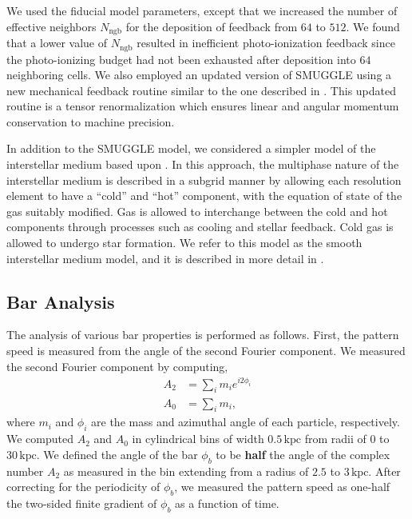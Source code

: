 \documentclass[twocolumn,linenumbers,trackchanges]{aastex631}
\newcommand{\SMUGGLE}{SMUGGLE}
\begin{document}
We used the fiducial model parameters, except that we increased the number of
effective neighbors $N_{\textrm{ngb}}$ for the deposition of feedback from $64$
to $512$. We found that a lower value of $N_{\textrm{ngb}}$ resulted in
inefficient photo-ionization feedback since the photo-ionizing budget had not
been exhausted after deposition into $64$ neighboring cells. We also employed an
updated version of \SMUGGLE{} using a new mechanical feedback routine similar to
the one described in \citet{2018MNRAS.480..800H}. This updated routine is a
tensor renormalization which ensures linear and angular momentum conservation to
machine precision.

In addition to the \SMUGGLE{} model, we considered a simpler model of the
interstellar medium based upon \citet{2003MNRAS.339..289S}. In this approach,
the multiphase nature of the interstellar medium is described in a subgrid
manner by allowing each resolution element to have a ``cold'' and ``hot''
component, with the equation of state of the gas suitably modified. Gas is
allowed to interchange between the cold and hot components through processes
such as cooling and stellar feedback. Cold gas is allowed to undergo star
formation. We refer to this model as the smooth interstellar medium model, and
it is described in more detail in \citet{2019MNRAS.489.4233M}.

\subsection{Bar Analysis}
\label{ssec:bar_analysis}
The analysis of various bar properties is performed as follows. First, the
pattern speed is measured from the angle of the second Fourier component. We
measured the second Fourier component by computing,
\begin{equation}
\begin{split}
A_2 &= \sum_i m_i e^{i 2 \phi_i} \\
A_0 &= \sum_i m_i \textrm{,}
\end{split}
\end{equation}
where $m_i$ and $\phi_i$ are the mass and azimuthal angle of each particle,
respectively. We computed $A_2$ and $A_0$ in cylindrical bins of width
$0.5\,\textrm{kpc}$ from radii of $0$ to $30\,\textrm{kpc}$. We defined the
angle of the bar $\phi_b$ to be {\bf half} the angle of the complex number $A_2$
as measured in the bin extending from a radius of $2.5$ to $3\,\textrm{kpc}$.
After correcting for the periodicity of $\phi_b$, we measured the pattern speed
as one-half the two-sided finite gradient of $\phi_b$ as a function of time.
\end{document}
